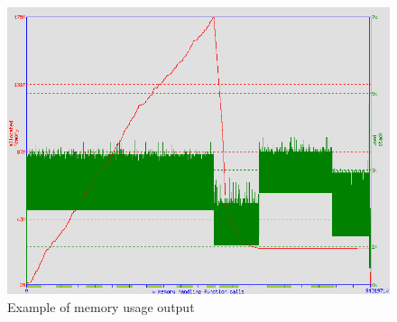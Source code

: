 \documentclass[11pt]{article}
\begin{document}
\begin{figure}[t]
\hspace{-2cm}
\includegraphics[scale=0.6]{img/Mem_usage}
\caption{Example of memory usage output}
\label{fig:memusg}
\end{figure}
\end{document}
